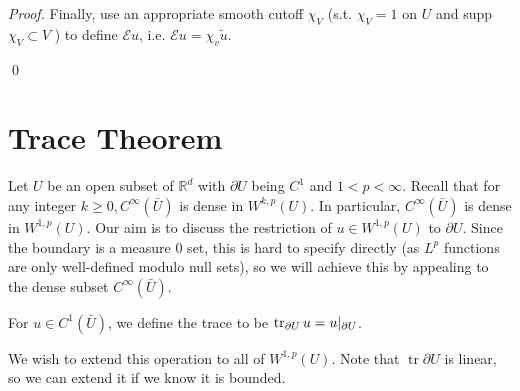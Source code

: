 \begin{proof}
Finally, use an appropriate smooth cutoff $\chi_{V}$ (s.t. $\chi_{V}=1$ on $U$ and supp $\chi_{V} \subset V$ ) to define $\mathcal{E} u$, i.e. $\mathcal{E} u=\chi_{v} \tilde{u}$.

\qed 
\end{proof}

\newpage 
\section{Trace Theorem}
Let $U$ be an open subset of $\mathbb{R}^{d}$ with $\partial U$ being $C^{1}$ and $1<p<\infty$. Recall that for any integer $k \geq 0, C^{\infty}(\bar{U})$ is dense in $W^{k, p}(U)$. In particular, $C^{\infty}(\bar{U})$ is dense in $W^{1, p}(U)$. Our aim is to discuss the restriction of $u \in W^{1, p}(U)$ to $\partial U$. Since the boundary is a measure 0 set, this is hard to specify directly (as $L^{p}$ functions are only well-defined modulo null sets), so we will achieve this by appealing to the dense subset $C^{\infty}(\bar{U})$.

\begin{definition}
[Trace]
For $u\in C^1(\bar U)$, we define the trace to be $\mathop{\mathrm{tr}}_{\partial U}u  = u|_{\partial U}$.
\end{definition}
We wish to extend this operation to all of $W^{1, p}(U)$. Note that $\operatorname{tr} \partial U$ is linear, so we can extend it if we know it is bounded.

